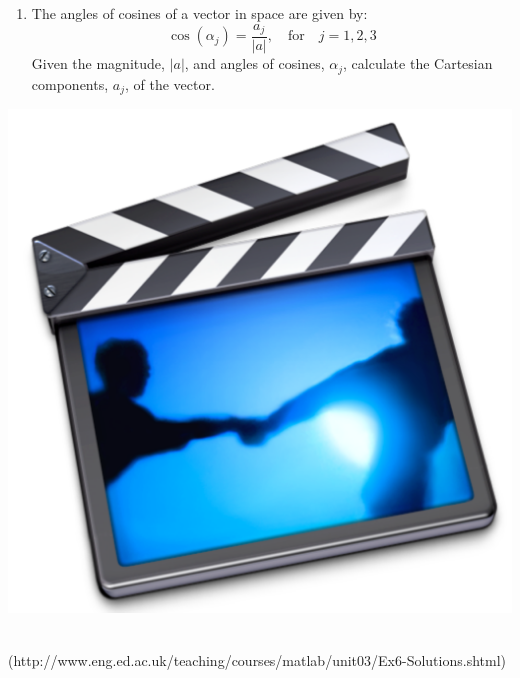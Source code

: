 {\begin{minipage}{\linewidth}
\begin{enumerate}
\begin{itemize}
	\item Create a column vector to hold the range 
	\item Calculate the corresponding values in Fahrenheit using 
	\item Create a matrix to hold the table using 
	\end{itemize}
Test your function for $T_{\textrm{lower}}=0~^{\circ}C$ and $T_{\textrm{upper}}=25~^{\circ}C$.
\item The angles of cosines of a vector in \threed space are given by:
\begin{equation*}
\cos(\alpha_j) = \frac{a_j}{|a|}, \quad \textrm{for} \quad j=1,2,3 
\end{equation*}
Given the magnitude, $|a|$, and angles of cosines, $\alpha_j$, calculate the Cartesian components, $a_j$, of the vector.
\end{enumerate}

\begin{minipage}{6mm}
\includegraphics[scale=0.03]{Graphics/General/screencast_icon}
\end{minipage}
\href{http://www.eng.ed.ac.uk/teaching/courses/matlab/unit03/Ex6-Solutions.shtml}{}\\
(http://www.eng.ed.ac.uk/teaching/courses/matlab/unit03/Ex6-Solutions.shtml)
\end{minipage}%
}\\
\addtolength{\parindent}{4mm}

